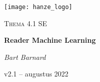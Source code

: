 \begin{titlepage}
	\centering
	\texttt{[image: hanze\_logo]}\par\vspace{1cm}
	\vspace{4cm}
	{\scshape\Large Thema 4.1 SE\par}
	\vspace{1.5cm}
	{\huge\bfseries Reader Machine Learning\par}
	\vspace{2cm}
	{\Large\itshape Bart Barnard\par}
	\vfill
	
	{\large v2.1 – augustus 2022\par}
\end{titlepage}

\tableofcontents
\newpage